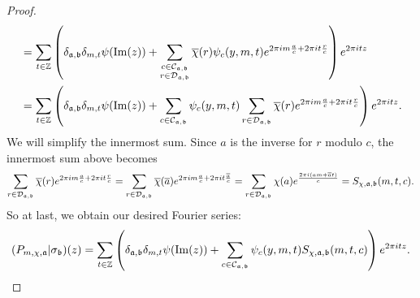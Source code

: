 \begin{proof}
\begin{align*}
        &= \sum_{t \in \mathbb{Z}}\left(\delta_{\mathfrak{a},\mathfrak{b}}\delta_{m,t}\psi(\mathrm{Im}(z))+\sum_{\substack{c \in \mathcal{C}_{\mathfrak{a},\mathfrak{b}} \\ r \in \mathcal{D}_{\mathfrak{a},\mathfrak{b}}}}\overline{\chi}(r)\psi_{c}(y,m,t)e^{2\pi im\frac{a}{c}+2\pi it\frac{r}{c}}\right)e^{2\pi itz} \\
        &= \sum_{t \in \mathbb{Z}}\left(\delta_{\mathfrak{a},\mathfrak{b}}\delta_{m,t}\psi(\mathrm{Im}(z))+\sum_{\substack{c \in \mathcal{C}_{\mathfrak{a},\mathfrak{b}}}}\psi_{c}(y,m,t)\sum_{r \in \mathcal{D}_{\mathfrak{a},\mathfrak{b}}}\overline{\chi}(r)e^{2\pi im\frac{a}{c}+2\pi it\frac{r}{c}}\right)e^{2\pi itz}.
      \end{align*}
      We will simplify the innermost sum. Since $a$ is the inverse for $r$ modulo $c$, the innermost sum above becomes
      \[
        \sum_{r \in \mathcal{D}_{\mathfrak{a},\mathfrak{b}}}\overline{\chi}(r)e^{2\pi im\frac{a}{c}+2\pi it\frac{r}{c}} = \sum_{r \in \mathcal{D}_{\mathfrak{a},\mathfrak{b}}}\overline{\chi}(\overline{a})e^{2\pi im\frac{a}{c}+2\pi it\frac{\overline{a}}{c}} = \sum_{r \in \mathcal{D}_{\mathfrak{a},\mathfrak{b}}}\chi(a)e^{\frac{2\pi i(am+\overline{a}t)}{c}} = S_{\chi,\mathfrak{a},\mathfrak{b}}(m,t,c).
      \]
      So at last, we obtain our desired Fourier series:
      \[
        (P_{m,\chi,\mathfrak{a}}|\sigma_{\mathfrak{b}})(z) = \sum_{t \in \mathbb{Z}}\left(\delta_{\mathfrak{a},\mathfrak{b}}\delta_{m,t}\psi(\mathrm{Im}(z))+\sum_{\substack{c \in \mathcal{C}_{\mathfrak{a},\mathfrak{b}}}}\psi_{c}(y,m,t)S_{\chi,\mathfrak{a},\mathfrak{b}}(m,t,c)\right)e^{2\pi itz}.
      \]
    \end{proof}